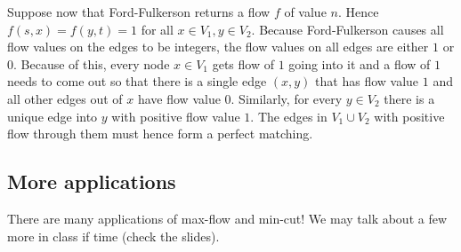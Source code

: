\documentclass [12pt]{article}
\theoremstyle{definition}
\begin{document}
Suppose now that Ford-Fulkerson returns a flow $f$ of value $n$. Hence $f (s, x) = f (y, t) = 1$ for all $x \in V_1, y \in V_2$. Because Ford-Fulkerson causes all flow values on the edges to be integers, the flow values on all edges are either $1$ or $0$. Because of this, every node $x \in V_1$ gets flow of $1$ going into it and a flow of $1$ needs to come out so that there is a single edge $(x, y )$ that has flow value $1$ and all other edges out of $x$ have flow value 0. Similarly, for every $y \in V_2$ there is a unique edge into $y$ with positive flow value $1$. The edges in $V_1 \cup V_2$ with positive flow through them must hence form a perfect matching.

\subsection{More applications}
There are many applications of max-flow and min-cut! We may talk about a few more in class if time (check the slides).
\end{document}
